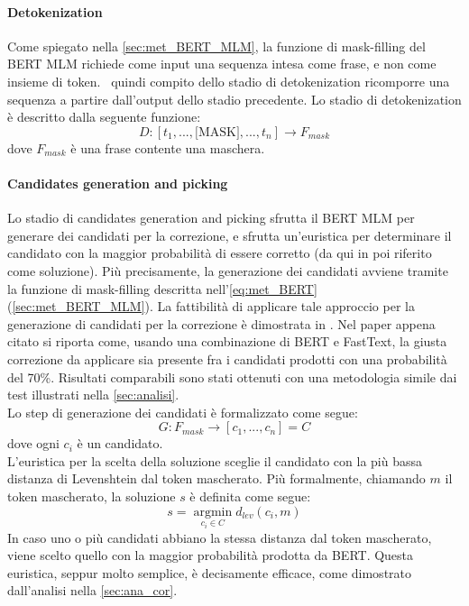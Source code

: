 \paragraph{Detokenization}
Come spiegato nella \autoref{sec:met_BERT_MLM}, la funzione di mask-filling del BERT MLM richiede come input una sequenza intesa come frase, e non come insieme di token. \E\ quindi compito dello stadio di detokenization ricomporre una sequenza a partire dall'output dello stadio precedente. Lo stadio di detokenization è descritto dalla seguente funzione:
\begin{equation}
D: [t_1,...,\text{[MASK]},...,t_n] \rightarrow F_{mask}
\end{equation}
dove $F_{mask}$ è una frase contente una maschera.

\paragraph{Candidates generation and picking}
Lo stadio di candidates generation and picking sfrutta il BERT MLM per generare dei candidati per la correzione, e sfrutta un'euristica per determinare il candidato con la maggior probabilità di essere corretto (da qui in poi riferito come soluzione). Più precisamente, la generazione dei candidati avviene tramite la funzione di mask-filling descritta nell'\autoref{eq:met_BERT} (\autoref{sec:met_BERT_MLM}). La fattibilità di applicare tale approccio per la generazione di candidati per la correzione è dimostrata in \cite{OCRMaskFilling}. Nel paper appena citato si riporta come, usando una combinazione di BERT e FastText, la giusta correzione da applicare sia presente fra i candidati prodotti con una probabilità del 70\%. Risultati comparabili sono stati ottenuti con una metodologia simile dai test illustrati nella \autoref{sec:analisi}.\\
Lo step di generazione dei candidati è formalizzato come segue:
\begin{equation}
G: F_{mask} \rightarrow [c_1,...,c_n]= C
\end{equation}
dove ogni $c_i$ è un candidato.\\
L'euristica per la scelta della soluzione sceglie il candidato con la più bassa distanza di Levenshtein dal token mascherato. Più formalmente, chiamando $m$ il token mascherato, la soluzione $s$ è definita come segue:
\begin{equation}
s = \operatorname*{argmin}_{c_i \in C} d_{lev}(c_i,m)
\end{equation}
In caso uno o più candidati abbiano la stessa distanza dal token mascherato, viene scelto quello con la maggior probabilità prodotta da BERT. Questa euristica, seppur molto semplice, è decisamente efficace, come dimostrato dall'analisi nella \autoref{sec:ana_cor}.

